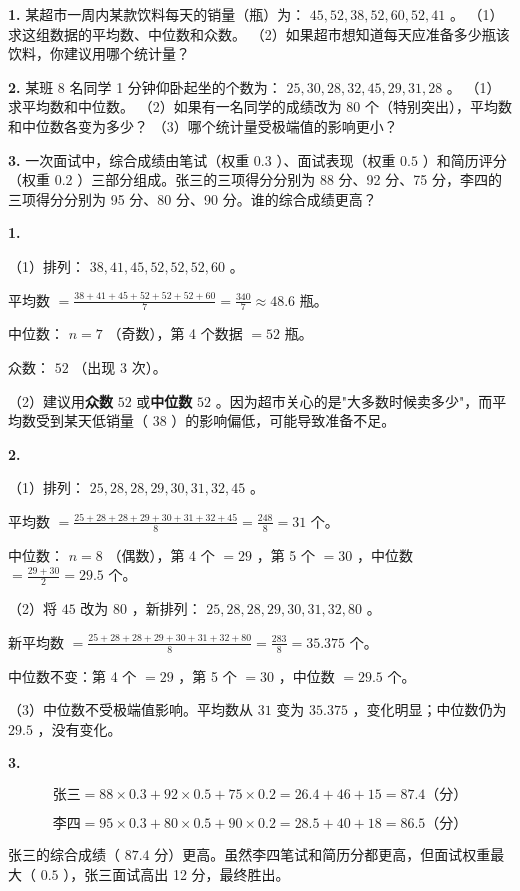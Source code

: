 \begin{practice}


\textbf{1.} 某超市一周内某款饮料每天的销量（瓶）为： $45, 52, 38, 52, 60, 52, 41$ 。
（1）求这组数据的平均数、中位数和众数。
（2）如果超市想知道每天应准备多少瓶该饮料，你建议用哪个统计量？

\textbf{2.} 某班 8 名同学 1 分钟仰卧起坐的个数为： $25, 30, 28, 32, 45, 29, 31, 28$ 。
（1）求平均数和中位数。
（2）如果有一名同学的成绩改为 $80$ 个（特别突出），平均数和中位数各变为多少？
（3）哪个统计量受极端值的影响更小？

\textbf{3.} 一次面试中，综合成绩由笔试（权重 $0.3$ ）、面试表现（权重 $0.5$ ）和简历评分（权重 $0.2$ ）三部分组成。张三的三项得分分别为 88 分、92 分、75 分，李四的三项得分分别为 95 分、80 分、90 分。谁的综合成绩更高？

\end{practice}



\begin{answer}


\textbf{1.}

（1）排列： $38, 41, 45, 52, 52, 52, 60$ 。

平均数 $= \frac{38 + 41 + 45 + 52 + 52 + 52 + 60}{7} = \frac{340}{7} \approx 48.6$ 瓶。

中位数： $n = 7$ （奇数），第 4 个数据 $= 52$ 瓶。

众数： $52$ （出现 3 次）。

（2）建议用\textbf{众数} $52$ 或\textbf{中位数} $52$ 。因为超市关心的是"大多数时候卖多少"，而平均数受到某天低销量（ $38$ ）的影响偏低，可能导致准备不足。

\textbf{2.}

（1）排列： $25, 28, 28, 29, 30, 31, 32, 45$ 。

平均数 $= \frac{25 + 28 + 28 + 29 + 30 + 31 + 32 + 45}{8} = \frac{248}{8} = 31$ 个。

中位数： $n = 8$ （偶数），第 4 个 $= 29$ ，第 5 个 $= 30$ ，中位数 $= \frac{29 + 30}{2} = 29.5$ 个。

（2）将 $45$ 改为 $80$ ，新排列： $25, 28, 28, 29, 30, 31, 32, 80$ 。

新平均数 $= \frac{25 + 28 + 28 + 29 + 30 + 31 + 32 + 80}{8} = \frac{283}{8} = 35.375$ 个。

中位数不变：第 4 个 $= 29$ ，第 5 个 $= 30$ ，中位数 $= 29.5$ 个。

（3）中位数不受极端值影响。平均数从 $31$ 变为 $35.375$ ，变化明显；中位数仍为 $29.5$ ，没有变化。

\textbf{3.}

\[
\text{张三} = 88 \times 0.3 + 92 \times 0.5 + 75 \times 0.2 = 26.4 + 46 + 15 = 87.4 \text{（分）}
\]


\[
\text{李四} = 95 \times 0.3 + 80 \times 0.5 + 90 \times 0.2 = 28.5 + 40 + 18 = 86.5 \text{（分）}
\]


张三的综合成绩（ $87.4$ 分）更高。虽然李四笔试和简历分都更高，但面试权重最大（ $0.5$ ），张三面试高出 12 分，最终胜出。

\end{answer}
